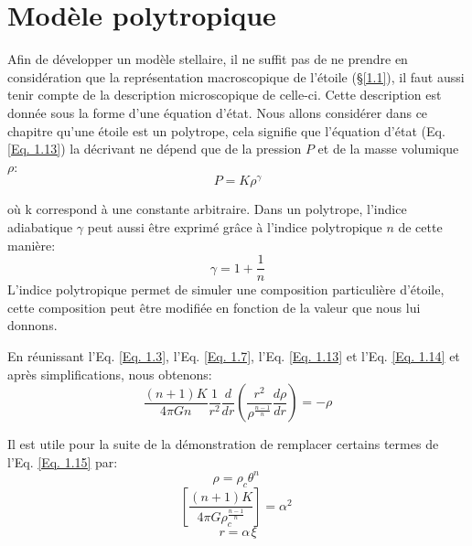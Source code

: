 \section{Modèle polytropique}\label{1.2}

Afin de développer un modèle stellaire, il ne suffit pas de ne prendre en considération que la représentation macroscopique de l'étoile (§\ref{1.1}), il faut aussi tenir compte de la description microscopique de celle-ci. Cette description est donnée sous la forme d'une équation d'état. Nous allons considérer dans ce chapitre qu'une étoile est un polytrope, cela signifie que l'équation d'état (Eq. \ref{Eq. 1.13}) la décrivant ne dépend que de la pression $P$ et de la masse volumique $\rho$:\begin{equation}P=K\rho^{\gamma}\label{Eq. 1.13}\end{equation}

où k correspond à une constante arbitraire. Dans un polytrope, l'indice adiabatique $\gamma$ peut aussi être exprimé grâce à l'indice polytropique $n$ de cette manière:\begin{equation}\gamma=1+\dfrac{1}{n}\label{Eq. 1.14}\end{equation} L'indice polytropique permet de simuler une composition particulière d'étoile, cette composition peut être modifiée en fonction de la valeur que nous lui donnons. \bigskip

En réunissant l'Eq. \ref{Eq. 1.3}, l'Eq. \ref{Eq. 1.7}, l'Eq. \ref{Eq. 1.13} et l'Eq. \ref{Eq. 1.14} et après simplifications, nous obtenons:\begin{equation}\dfrac{(n+1)K}{4\pi Gn}\dfrac{1}{r^{2}}\dfrac{d}{dr}\left( \dfrac{r^{2}}{\rho^{\frac{n-1}{n}}}\dfrac{d\rho}{dr}\right) =-\rho\label{Eq. 1.15}\end{equation}

\vfill
{}




Il est utile pour la suite de la démonstration de remplacer certains termes de l'Eq. \ref{Eq. 1.15} par:
\begin{equation}\rho=\rho_{c} \theta^{n}\hspace{3pt}\label{Eq. 1.16}\end{equation}
\begin{equation}\left[\dfrac{(n+1)K}{4\pi G\rho^{\frac{n-1}{n}}_{c}}\right]=\alpha^{2}\hspace{3pt}\label{Eq. 1.17}\end{equation} 
\begin{equation}r=\alpha\hspace{1pt}\xi\label{Eq. 1.18}\end{equation}


